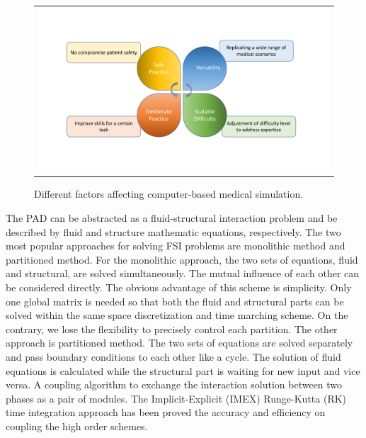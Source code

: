 \begin{figure}[H]
	\centering
	\begin{tabular}{c}
		\includegraphics[width=1.0\textwidth]{./pics/computer_simulation}
	\end{tabular}
	\caption{\footnotesize Different factors affecting computer-based medical simulation.} \label{fig: ch1f1}
\end{figure}

The PAD can be abstracted as a fluid-structural interaction problem and be described by fluid and structure mathematic equations, respectively.  The two most popular approaches for solving FSI problems are monolithic method and partitioned method. For the monolithic approach, the two sets of equations, fluid and structural, are solved simultaneously. The mutual influence of each other can be considered directly. The obvious advantage of this scheme is simplicity. Only one global matrix is needed so that both the fluid and structural parts can be solved within the same space discretization and time marching scheme. On the contrary, we lose the flexibility to precisely control each partition. The other approach is partitioned method. The two sets of equations are solved separately and pass boundary conditions to each other like a cycle. The solution of fluid equations is calculated while the structural part is waiting for new input and vice versa. A coupling algorithm to exchange the interaction solution between two phases as a pair of modules. The Implicit-Explicit (IMEX) Runge-Kutta (RK) time integration approach has been proved the accuracy and efficiency on coupling the high order schemes\cite{zhang2016high}.

